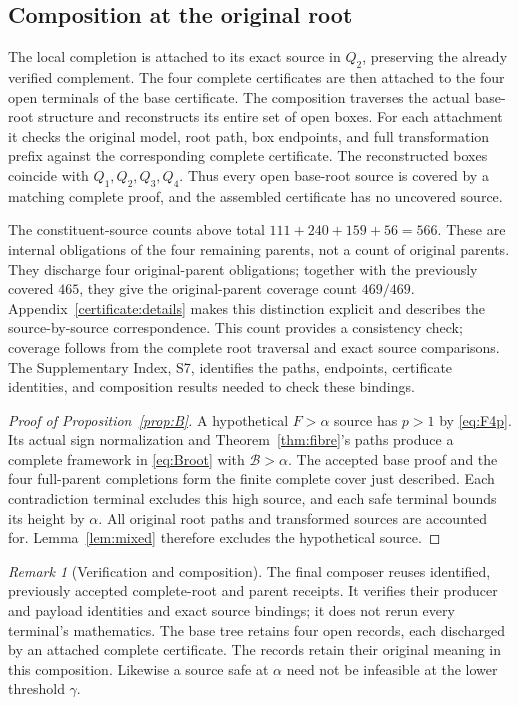 \documentclass[11pt,reqno]{amsart}
\theoremstyle{definition}
\theoremstyle{remark}
\newtheorem{remark}[theorem]{Remark}
\newcommand{\gam}{\gamma}
\newcommand{\cB}{\mathcal B}
\begin{document}
\subsection{Composition at the original root}
The local completion is attached to its exact source in \(Q_2\),
preserving the already verified complement. The four complete
certificates are then attached to the four open terminals of the
base certificate. The composition traverses the actual base-root
structure and reconstructs its entire set of open boxes.
For each attachment it checks the original model, root path,
box endpoints, and full transformation prefix against the
corresponding complete certificate.
The reconstructed boxes coincide with \(Q_1,Q_2,Q_3,Q_4\).
Thus every open base-root source is covered by a matching complete
proof, and the assembled certificate has no uncovered source.

The constituent-source counts above total
\(111+240+159+56=566\). These are internal obligations of the four
remaining parents, not a count of original parents. They discharge four
original-parent obligations; together with the previously covered
\(465\), they give the original-parent coverage count \(469/469\).
Appendix~\ref{certificate:details} makes this distinction explicit and
describes the source-by-source correspondence.
This count provides a consistency check; coverage follows from
the complete root traversal and exact source comparisons.
The Supplementary Index, S7, identifies the paths, endpoints, certificate
identities, and composition results needed to check these bindings.

\begin{proof}[Proof of Proposition~\ref{prop:B}]
A hypothetical \(F>\alpha\) source has \(p>1\) by \eqref{eq:F4p}.
Its actual sign normalization and Theorem~\ref{thm:fibre}'s paths
produce a complete framework in \eqref{eq:Broot} with
\(\cB>\alpha\). The accepted base proof and the four full-parent
completions form the finite complete cover just described.
Each contradiction terminal excludes this high source, and each
safe terminal bounds its height by \(\alpha\). All original root
paths and transformed sources are accounted for.
Lemma~\ref{lem:mixed} therefore excludes the hypothetical source.
\end{proof}

\begin{remark}[Verification and composition]
The final composer reuses identified, previously accepted complete-root
and parent receipts. It verifies their producer and payload identities
and exact source bindings; it does not rerun every terminal's
mathematics. The base tree retains four open records, each discharged by an
attached complete certificate. The records retain their original
meaning in this composition.
Likewise a source safe at \(\alpha\) need not be infeasible at
the lower threshold \(\gam\).
\end{remark}
\end{document}
